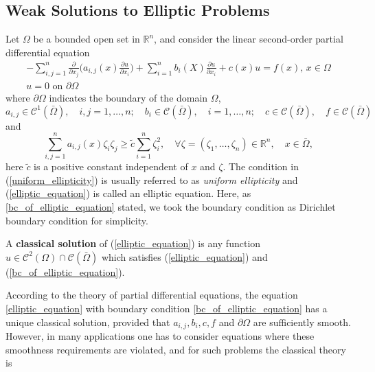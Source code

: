 \subsection{Weak Solutions to Elliptic Problems}
Let $\Omega$ be a bounded open set in $\mathbb{R}^n$, and consider the linear second-order partial differential equation
\begin{eqnarray}\label{elliptic_equation}
	-\sum_{i,j=1}^{n} \frac{\partial}{\partial x_j} \bigg(a_{i,j}(x)\frac{\partial u}{\partial x_i}\bigg) + \sum_{i=1}^{n} b_{i}(X)\frac{\partial u}{\partial x_i} + c(x)u = f(x) \text{,     } x \in \Omega \\
	\label{bc_of_elliptic_equation}
	u = 0 \text{ on } \partial\Omega
\end{eqnarray}
where $\partial\Omega$ indicates the boundary of the domain $\Omega$,
\begin{equation*}
a_{i,j} \in \mathscr{C}^1(\bar{\Omega}), \quad i,j = 1,\dots, n; \quad 
b_i \in \mathscr{C}(\bar{\Omega}), \quad i = 1,\dots, n;\quad
c \in \mathscr{C}(\bar{\Omega}), \quad f\in\mathscr{C}(\bar{\Omega})
\end{equation*}
and 
\begin{equation}\label{uniform_ellipticity}
	\sum_{i,j=1}^{n}a_{i,j}(x)\zeta_i \zeta_j \geq \tilde{c} \sum_{i=1}^{n} \zeta_i^2, \quad \forall\zeta = (\zeta_1,\dots, \zeta_n)\in \mathbb{R}^n, \quad  x\in \bar{\Omega},
\end{equation}
here $\tilde{c}$ is a positive constant independent of $x$ and $\zeta$. The condition in (\ref{uniform_ellipticity}) is usually referred to as \textit{uniform ellipticity} and (\ref{elliptic_equation}) is called an elliptic equation. Here, as \ref{bc_of_elliptic_equation} stated, we took the boundary condition as Dirichlet boundary condition for simplicity.\\
\begin{defn}
	A \textbf{classical solution} of (\ref{elliptic_equation}) is any function $u\in\mathscr{C}^2(\Omega)\cap\mathscr{C}(\bar{\Omega})$ which satisfies (\ref{elliptic_equation}) and (\ref{bc_of_elliptic_equation}). 
\end{defn}
According to the theory of partial differential equations, the equation \eqref{elliptic_equation} with boundary condition \eqref{bc_of_elliptic_equation} has a unique classical solution, provided that $a_{i,j} , b_i , c, f$ and $\partial\Omega$ are sufficiently
smooth. However, in many applications one has to consider equations where these
smoothness requirements are violated, and for such problems the classical theory is
